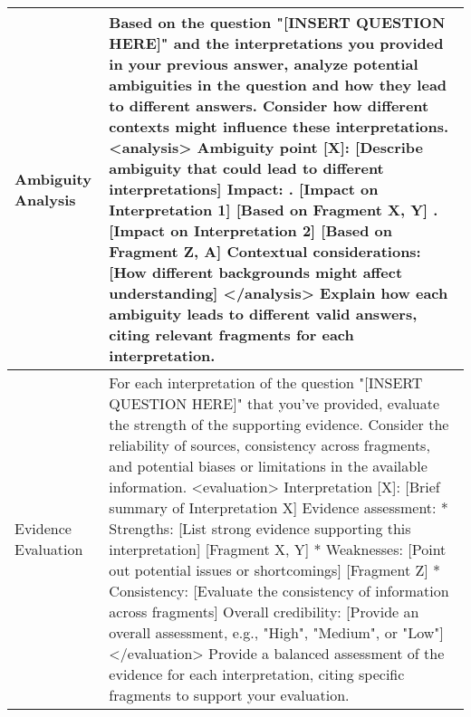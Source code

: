 \begin{tabular}{l p{}}
\hline
Ambiguity Analysis & Based on the question "[INSERT QUESTION HERE]" and the interpretations you provided in your previous answer, analyze potential ambiguities in the question and how they lead to different answers. Consider how different contexts might influence these interpretations. \newline
<analysis> \newline
Ambiguity point [X]: [Describe ambiguity that could lead to different interpretations] \newline
Impact: \newline
1. [Impact on Interpretation 1] [Based on Fragment X, Y] \newline
2. [Impact on Interpretation 2] [Based on Fragment Z, A] \newline
Contextual considerations: [How different backgrounds might affect understanding]  \newline
</analysis> \newline
Explain how each ambiguity leads to different valid answers, citing relevant fragments for each interpretation. \\
\hline
Evidence Evaluation & For each interpretation of the question "[INSERT QUESTION HERE]" that you've provided, evaluate the strength of the supporting evidence. Consider the reliability of sources, consistency across fragments, and potential biases or limitations in the available information. \newline
<evaluation> \newline
Interpretation [X]: [Brief summary of Interpretation X] \newline
Evidence assessment: \newline
* Strengths: [List strong evidence supporting this interpretation] [Fragment X, Y] \newline
* Weaknesses: [Point out potential issues or shortcomings] [Fragment Z] \newline
* Consistency: [Evaluate the consistency of information across fragments] \newline
Overall credibility: [Provide an overall assessment, e.g., "High", "Medium", or "Low"]  \newline
</evaluation> \newline
Provide a balanced assessment of the evidence for each interpretation, citing specific fragments to support your evaluation. \\
\hline
\end{tabular}

